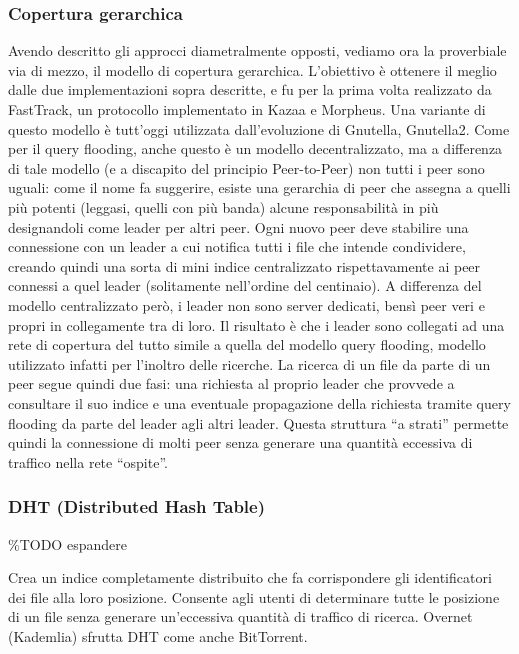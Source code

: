 \subsubsection{Copertura gerarchica}\label{copertura-gerarchica}

Avendo descritto gli approcci diametralmente opposti, vediamo ora la
proverbiale via di mezzo, il modello di copertura gerarchica.
L'obiettivo è ottenere il meglio dalle due implementazioni sopra
descritte, e fu per la prima volta realizzato da FastTrack, un
protocollo implementato in Kazaa e Morpheus. Una variante di questo
modello è tutt'oggi utilizzata dall'evoluzione di Gnutella, Gnutella2.
Come per il query flooding, anche questo è un modello decentralizzato,
ma a differenza di tale modello (e a discapito del principio
Peer-to-Peer) non tutti i peer sono uguali: come il nome fa suggerire,
esiste una gerarchia di peer che assegna a quelli più potenti (leggasi,
quelli con più banda) alcune responsabilità in più designandoli come
leader per altri peer. Ogni nuovo peer deve stabilire una connessione
con un leader a cui notifica tutti i file che intende condividere,
creando quindi una sorta di mini indice centralizzato rispettavamente ai
peer connessi a quel leader (solitamente nell'ordine del centinaio). A
differenza del modello centralizzato però, i leader non sono server
dedicati, bensì peer veri e propri in collegamente tra di loro. Il
risultato è che i leader sono collegati ad una rete di copertura del
tutto simile a quella del modello query flooding, modello utilizzato
infatti per l'inoltro delle ricerche. La ricerca di un file da parte di
un peer segue quindi due fasi: una richiesta al proprio leader che
provvede a consultare il suo indice e una eventuale propagazione della
richiesta tramite query flooding da parte del leader agli altri leader.
Questa struttura ``a strati'' permette quindi la connessione di molti
peer senza generare una quantità eccessiva di traffico nella rete
``ospite''.

\subsubsection{DHT (Distributed Hash
Table)}\label{dht-distributed-hash-table}

\%TODO espandere

Crea un indice completamente distribuito che fa corrispondere gli
identificatori dei file alla loro posizione. Consente agli utenti di
determinare tutte le posizione di un file senza generare un'eccessiva
quantità di traffico di ricerca. Overnet (Kademlia) sfrutta DHT come
anche BitTorrent.
